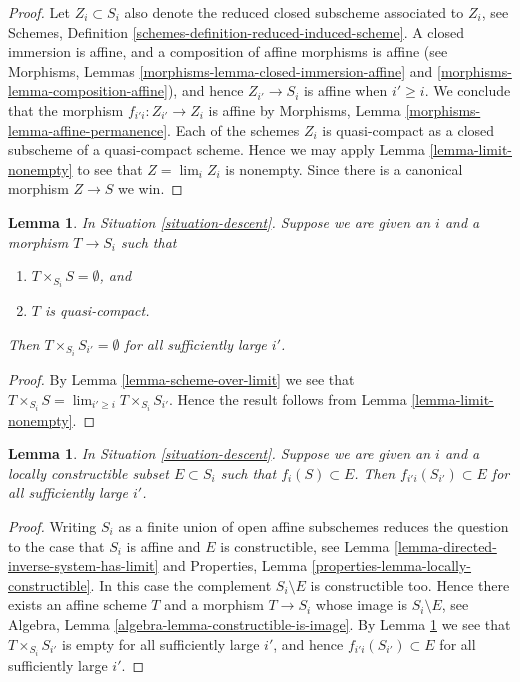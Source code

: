 \documentclass{stacks-project}
\theoremstyle{plain}
\newtheorem{lemma}[subsection]{Lemma}
\theoremstyle{definition}
\theoremstyle{remark}
\numberwithin{equation}{subsection}
\def\lim{\mathop{\mathrm{lim}}\nolimits}
\begin{document}
\begin{proof}
Let $Z_i \subset S_i$ also denote the reduced closed subscheme
associated to $Z_i$, see Schemes,
Definition \ref{schemes-definition-reduced-induced-scheme}.
A closed immersion is affine, and a composition of affine
morphisms is affine (see
Morphisms, Lemmas \ref{morphisms-lemma-closed-immersion-affine}
and \ref{morphisms-lemma-composition-affine}), and hence $Z_{i'} \to S_i$ is
affine when $i' \geq i$. We conclude that the morphism
$f_{i'i} : Z_{i'} \to Z_i$ is affine by
Morphisms, Lemma \ref{morphisms-lemma-affine-permanence}.
Each of the schemes $Z_i$ is quasi-compact as a closed
subscheme of a quasi-compact scheme. Hence we may apply
Lemma \ref{lemma-limit-nonempty} to see that
$Z = \lim_i Z_i$ is nonempty. Since there is a
canonical morphism $Z \to S$ we win.
\end{proof}

\begin{lemma}
\label{lemma-limit-fibre-product-empty}
In Situation \ref{situation-descent}.
Suppose we are given an $i$ and a morphism $T \to S_i$ such that
\begin{enumerate}
\item $T \times_{S_i} S = \emptyset$, and
\item $T$ is quasi-compact.
\end{enumerate}
Then $T \times_{S_i} S_{i'} = \emptyset$ for all sufficiently large $i'$.
\end{lemma}

\begin{proof}
By Lemma \ref{lemma-scheme-over-limit}
we see that $T \times_{S_i} S = \lim_{i' \geq i} T \times_{S_i} S_{i'}$.
Hence the result follows from
Lemma \ref{lemma-limit-nonempty}.
\end{proof}

\begin{lemma}
\label{lemma-limit-contained-in-constructible}
In Situation \ref{situation-descent}.
Suppose we are given an $i$ and a locally constructible subset
$E \subset S_i$ such that $f_i(S) \subset E$.
Then $f_{i'i}(S_{i'}) \subset E$ for all sufficiently large $i'$.
\end{lemma}

\begin{proof}
Writing $S_i$ as a finite union of open affine subschemes reduces
the question to the case that $S_i$ is affine and $E$ is constructible, see
Lemma \ref{lemma-directed-inverse-system-has-limit}
and
Properties, Lemma \ref{properties-lemma-locally-constructible}.
In this case the complement $S_i \setminus E$ is constructible too.
Hence there exists an affine scheme $T$ and a morphism $T \to S_i$
whose image is $S_i \setminus E$, see
Algebra, Lemma \ref{algebra-lemma-constructible-is-image}.
By
Lemma \ref{lemma-limit-fibre-product-empty}
we see that $T \times_{S_i} S_{i'}$ is empty for all sufficiently large
$i'$, and hence $f_{i'i}(S_{i'}) \subset E$ for all sufficiently large $i'$.
\end{proof}
\end{document}
